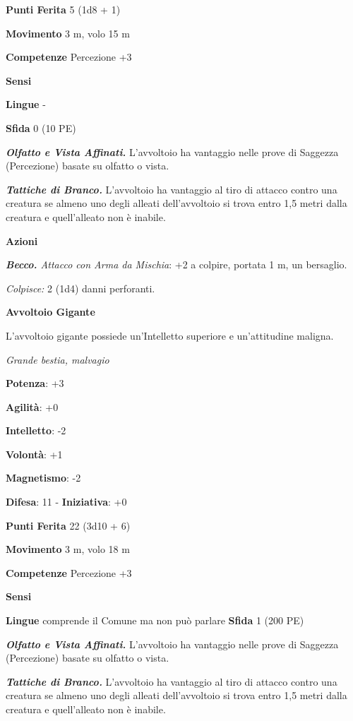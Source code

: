 \begin{multicols}{2}
\textbf{Punti Ferita} 5 (1d8 + 1)

\textbf{Movimento} 3 m, volo 15 m

\textbf{Competenze} Percezione +3

\textbf{Sensi} 

\textbf{Lingue} -

\textbf{Sfida} 0 (10 PE)\smallskip

\emph{\textbf{Olfatto e Vista Affinati.}} L'avvoltoio ha vantaggio nelle
prove di Saggezza (Percezione) basate su olfatto o vista.

\emph{\textbf{Tattiche di Branco.}} L'avvoltoio ha vantaggio al tiro di
attacco contro una creatura se almeno uno degli alleati dell'avvoltoio
si trova entro 1,5 metri dalla creatura e quell'alleato non è inabile.

\smallskip\textbf{Azioni}

\emph{\textbf{Becco.} Attacco con Arma da Mischia}: +2 a colpire,
portata 1 m, un bersaglio.

\emph{Colpisce:} 2 (1d4) danni perforanti.

\textbf{Avvoltoio Gigante}

L'avvoltoio gigante possiede un'Intelletto superiore e un'attitudine
maligna.

\emph{Grande bestia, malvagio}

\textbf{Potenza}: +3

\textbf{Agilità}: +0

\textbf{Intelletto}: -2

\textbf{Volontà}: +1

\textbf{Magnetismo}: -2

\textbf{Difesa}: 11 - \textbf{Iniziativa}: +0

\textbf{Punti Ferita} 22 (3d10 + 6)

\textbf{Movimento} 3 m, volo 18 m

\textbf{Competenze} Percezione +3

\textbf{Sensi} 

\textbf{Lingue} comprende il Comune ma non può parlare \textbf{Sfida} 1
(200 PE)\smallskip

\emph{\textbf{Olfatto e Vista Affinati.}} L'avvoltoio ha vantaggio nelle
prove di Saggezza (Percezione) basate su olfatto o vista.

\emph{\textbf{Tattiche di Branco.}} L'avvoltoio ha vantaggio al tiro di
attacco contro una creatura se almeno uno degli alleati dell'avvoltoio
si trova entro 1,5 metri dalla creatura e quell'alleato non è inabile.


\end{multicols}

